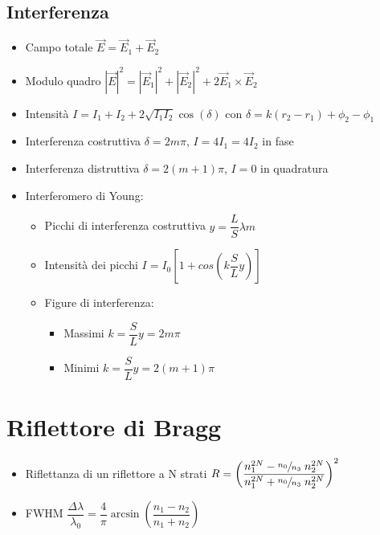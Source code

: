 \documentclass{article}
\begin{document}
\subsection{Interferenza}
\begin{itemize}
  \item Campo totale \( \vec{E} = \vec{E}_1 + \vec{E}_2 \)
  \item Modulo quadro \( \displaystyle |\vec{E}| ^ 2 = |\vec{E}_1| ^ 2 + |\vec{E}_2| ^ 2 + 2 \vec{E}_1 \times \vec{E}_2 \)
  \item Intensità \( \displaystyle  I = I_1 + I_2 + 2 \sqrt{I_1 I_2} \cos(\delta) \) con \( \delta = k(r_2 - r_1) + \phi_2 - \phi_1 \) %
  \item Interferenza costruttiva \( \delta = 2 m \pi \), \(I = 4 I_1 = 4 I_2 \) in fase
  \item Interferenza distruttiva \( \delta = 2 (m + 1) \pi \), \(I = 0 \) in quadratura
  \item Interferomero di Young:
        \begin{itemize}
          \item Picchi di interferenza costruttiva \( y = \dfrac{L}{S} \lambda m \)
          \item Intensità dei picchi \( I = I_0  \left[ 1 + cos\left( k \dfrac{S}{L} y \right) \right] \)
          \item Figure di interferenza:
                \begin{itemize}
                  \item Massimi \( k = \dfrac{S}{L} y = 2m \pi \)
                  \item Minimi \( k = \dfrac{S}{L} y = 2(m+1) \pi \)
                \end{itemize}
        \end{itemize}
\end{itemize}

\section{Riflettore di Bragg}
\begin{itemize}
  \item Riflettanza di un riflettore a N strati \( R = \left( \dfrac{n_1 ^ {2N} - \sfrac{n_0}{n_3} \; n_2 ^ {2N}}{n_1 ^ {2N} + \sfrac{n_0}{n_3} \; n_2 ^ {2N}} \right) ^ 2 \)
  \item FWHM \( \dfrac{\Delta \lambda}{\lambda_0} = \dfrac{4}{\pi} \arcsin \left( \dfrac{n_1 - n_2}{n_1 + n_2} \right) \)
\end{itemize}
\end{document}
